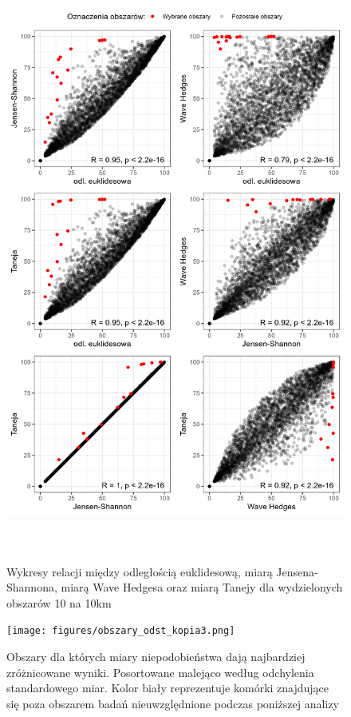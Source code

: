 \documentclass{amuthesis}
\begin{document}
\begin{figure}[H]

{\centering \includegraphics[width=5.20833in,height=7.8125in]{figures/relacje_miar1.png}

}

\caption{\label{fig-relacje_miar1}Wykresy relacji między odległością
euklidesową, miarą Jensena-Shannona, miarą Wave Hedgesa oraz miarą
Tanejy dla wydzielonych obszarów 10 na 10km}

\end{figure}

\begin{figure}[t]

{\centering \texttt{[image: figures/obszary\_odst\_kopia3.png]}

}

\caption{\label{fig-obszary_odst}Obszary dla których miary
niepodobieństwa dają najbardziej zróżnicowane wyniki. Posortowane
malejąco według odchylenia standardowego miar. Kolor biały reprezentuje
komórki znajdujące się poza obszarem badań nieuwzględnione podczas
poniższej analizy}

\end{figure}
\end{document}
